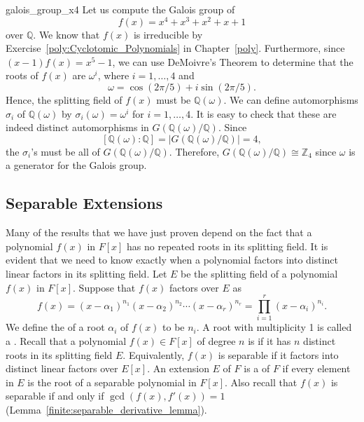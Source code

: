 \begin{example}{galois_group_x4}
Let us compute the Galois group of 
\[
f(x) = x^4 + x^3 + x^2 + x + 1
\]
over ${\mathbb Q}$. We know that $f(x)$ is irreducible by Exercise~\ref{poly:Cyclotomic_Polynomials} in
Chapter~\ref{poly}.  Furthermore, since $(x -1)f(x) = x^5 -1$, we can use
DeMoivre's Theorem to determine that the roots of $f(x)$ are
$\omega^i$,  where  $i = 1, \ldots, 4$ and 
\[
\omega = \cos(2 \pi / 5 ) + i \sin(2 \pi / 5 ).
\]
Hence, the splitting field of $f(x)$ must be ${\mathbb Q}(\omega)$.  We 
can define automorphisms $\sigma_i$ of ${\mathbb Q}(\omega )$ by 
$\sigma_i( \omega ) = \omega^i$ for $i = 1, \ldots, 4$.  It is easy to check
that these are indeed distinct automorphisms in $G( {\mathbb Q}( \omega)
/ {\mathbb Q} )$.  Since 
\[
[{\mathbb Q}( \omega) : {\mathbb Q}] = | G( {\mathbb Q}(
\omega) / {\mathbb Q})| = 4,
\]
the $\sigma_i$'s must be all of $G( {\mathbb
Q}( \omega) / {\mathbb Q} )$. Therefore, $G({\mathbb Q}( \omega) / {\mathbb Q})
\cong {\mathbb Z}_4$ since $\omega$ is a generator for the Galois group. 
\end{example}
 
 
 
\subsection*{Separable Extensions}
 
 
Many of the results that we have just proven depend on the fact that a
polynomial $f(x)$ in $F[x]$ has no repeated roots in its splitting
field. It is evident that we need to know exactly when a
polynomial factors into distinct linear factors in its splitting
field. Let $E$ be the splitting field of a polynomial $f(x)$ in $F[x]$.
Suppose that $f(x)$ factors over $E$ as
\[
f(x) = (x - \alpha_1)^{n_1} (x - \alpha_2)^{n_2} \cdots (x -
\alpha_r)^{n_r} = \prod_{i=1}^{r} (x - \alpha_i)^{n_i}.
\]
We define the  of a root $\alpha_i$ of $f(x)$ to be
$n_i$.  A root with multiplicity 1 is called a . Recall that a polynomial $f(x) \in F[x]$ of
degree $n$ is  if it has
$n$ distinct roots in its splitting field $E$. Equivalently, $f(x)$ is
separable if it factors into distinct linear factors over $E[x]$.
An extension $E$ of $F$ is a  of $F$ if every element in $E$
is the root of a separable polynomial in $F[x]$. Also recall that
$f(x)$ is separable if and only if $\gcd( f(x), f'(x)) = 1$
(Lemma~\ref{finite:separable_derivative_lemma}). 
 

